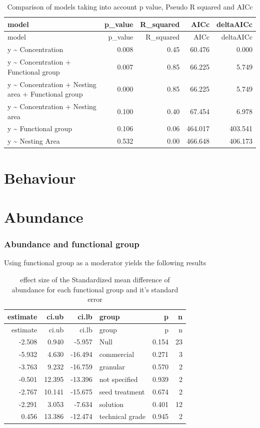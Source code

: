 \documentclass[]{elsarticle} %
\begin{document}
\begin{longtable}[c]{@{}lrrrr@{}}
\caption{Comparison of models taking into account p value, Pseudo R
squared and AICc}\tabularnewline
\toprule
model & p\_value & R\_squared & AICc & deltaAICc\tabularnewline
\midrule
\endfirsthead
\toprule
model & p\_value & R\_squared & AICc & deltaAICc\tabularnewline
\midrule
\endhead
y \textasciitilde{} Concentration & 0.008 & 0.45 & 60.476 &
0.000\tabularnewline
y \textasciitilde{} Concentration + Functional group & 0.007 & 0.85 &
66.225 & 5.749\tabularnewline
y \textasciitilde{} Concentration + Nesting area + Functional group &
0.000 & 0.85 & 66.225 & 5.749\tabularnewline
y \textasciitilde{} Concentration + Nesting area & 0.100 & 0.40 & 67.454
& 6.978\tabularnewline
y \textasciitilde{} Functional group & 0.106 & 0.06 & 464.017 &
403.541\tabularnewline
y \textasciitilde{} Nesting Area & 0.532 & 0.00 & 466.648 &
406.173\tabularnewline
\bottomrule
\end{longtable}

\section{Behaviour}\label{behaviour}

\section{Abundance}\label{abundance-1}

\subsubsection{Abundance and functional
group}\label{abundance-and-functional-group-1}

Using functional group as a moderator yields the following results

\begin{longtable}[c]{@{}rrrlrr@{}}
\caption{effect size of the Standardized mean difference of abundance
for each functional group and it's standard error}\tabularnewline
\toprule
estimate & ci.ub & ci.lb & group & p & n\tabularnewline
\midrule
\endfirsthead
\toprule
estimate & ci.ub & ci.lb & group & p & n\tabularnewline
\midrule
\endhead
-2.508 & 0.940 & -5.957 & Null & 0.154 & 23\tabularnewline
-5.932 & 4.630 & -16.494 & commercial & 0.271 & 3\tabularnewline
-3.763 & 9.232 & -16.759 & granular & 0.570 & 2\tabularnewline
-0.501 & 12.395 & -13.396 & not specified & 0.939 & 2\tabularnewline
-2.767 & 10.141 & -15.675 & seed treatment & 0.674 & 2\tabularnewline
-2.291 & 3.053 & -7.634 & solution & 0.401 & 12\tabularnewline
0.456 & 13.386 & -12.474 & technical grade & 0.945 & 2\tabularnewline
\bottomrule
\end{longtable}
\end{document}

